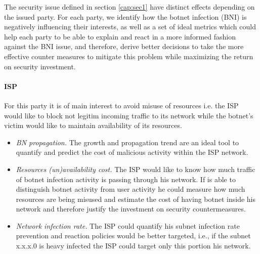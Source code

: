 \label{cap:sec2}
The security issue defined in section \ref{cap:sec1} have distinct effects depending on the issued party.
For each party, we identify how the botnet infection (BNI) is negatively influencing their interests, as well as a set of ideal metrics which could help each party to be able to explain and react in a more informed fashion against the BNI issue, and therefore, derive better decisions to take the more effective counter measures to mitigate this problem while maximizing the return on security investment.
\indent
\paragraph{ISP}
For this party it is of main interest to avoid misuse of resources i.e. the ISP would like to block not legitim incoming traffic to its network while the botnet's victim would like to maintain availability of its resources.
\begin{itemize}
    \item \textit{BN propagation.} The growth and propagation trend are an ideal tool to quantify and predict the cost of malicious activity within the ISP network.
    \item \textit{Resources (un)availability cost.} The ISP would like to know how much traffic of botnet infection activity is passing through his network. If is able to distinguish botnet activity from user activity he could measure how much resources are being misused and estimate the cost of having botnet inside his network and therefore justify the investment on security countermeasures.
    \item \textit{Network infection rate.} The ISP could quantify his subnet infection rate prevention and reaction policies would be better targeted, i.e., if the subnet x.x.x.0 is heavy infected the ISP could target only this portion his network.
\end{itemize}
\indent
